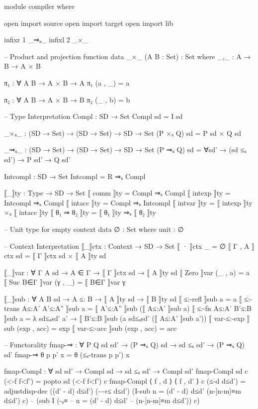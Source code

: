 \documentclass{article}
\begin{document}
\begin{prev}
\begin{code}
module compiler where

open import source
open import target
open import lib


infixr 1 _⇒ₛ_ 
infixl 2 _×_

-- Product and projection function
data _×_ (A B : Set) : Set where
    _,_ : A → B → A × B

π₁ : ∀ {A B} → A × B → A
π₁ (a , _) = a

π₂ : ∀ {A B} → A × B → B
π₂ (_ , b) = b

--  Type Interpretation
Compl : SD → Set
Compl sd = I sd

_×ₛ_ : (SD → Set) → (SD → Set) → SD → Set
(P ×ₛ Q) sd = P sd × Q sd

_⇒ₛ_ : (SD → Set) → (SD → Set) → SD → Set
(P ⇒ₛ Q) sd = ∀{sd'} → (sd ≤ₛ sd') → P sd' → Q sd' 

Intcompl : SD → Set
Intcompl = R ⇒ₛ Compl


⟦_⟧ty : Type → SD → Set
⟦ comm ⟧ty = Compl ⇒ₛ Compl
⟦ intexp ⟧ty = Intcompl ⇒ₛ Compl
⟦ intacc ⟧ty = Compl ⇒ₛ Intcompl
⟦ intvar ⟧ty = ⟦ intexp ⟧ty ×ₛ ⟦ intacc ⟧ty
⟦ θ₁ ⇒ θ₂ ⟧ty = ⟦ θ₁ ⟧ty ⇒ₛ ⟦ θ₂ ⟧ty

-- Unit type for empty context
data ∅ : Set where
    unit : ∅

-- Context Interpretation
⟦_⟧ctx : Context → SD → Set
⟦ · ⟧ctx _ = ∅
⟦ Γ , A ⟧ctx sd = ⟦ Γ ⟧ctx sd × ⟦ A ⟧ty sd

⟦_⟧var : ∀ {Γ A sd} → A ∈ Γ → ⟦ Γ ⟧ctx sd → ⟦ A ⟧ty sd
⟦ Zero ⟧var (_ , a) = a
⟦ Suc B∈Γ ⟧var (γ , _) =  ⟦ B∈Γ ⟧var γ

⟦_⟧sub : ∀ {A B sd} → A ≤: B → ⟦ A ⟧ty sd → ⟦ B ⟧ty sd
⟦ ≤:-refl ⟧sub a = a
⟦ ≤:-trans A≤:A' A'≤:A'' ⟧sub a = ⟦ A'≤:A'' ⟧sub (⟦ A≤:A' ⟧sub a)
⟦ ≤:-fn A≤:A' B'≤:B ⟧sub a = λ sd≤ₛsd' a' → ⟦ B'≤:B ⟧sub (a sd≤ₛsd' (⟦ A≤:A' ⟧sub a'))
⟦ var-≤:-exp ⟧sub (exp , acc) = exp
⟦ var-≤:-acc ⟧sub (exp , acc) = acc


-- Functorality
fmap-⇒ : ∀ {P Q sd sd'} → (P ⇒ₛ Q) sd → sd ≤ₛ sd' → (P ⇒ₛ Q) sd'
fmap-⇒ θ p p' x = θ (≤ₛ-trans p p') x

fmap-Compl : ∀ {sd sd'} → Compl sd → sd ≤ₛ sd' → Compl sd'
fmap-Compl {sd} c (<-f f<f') = popto sd (<-f f<f') c
fmap-Compl {⟨ f , d ⟩} {⟨ f , d' ⟩} c (≤-d d≤d') = 
    adjustdisp-dec ((d' - d) d≤d') (-→≤ d≤d') 
        (I-sub {n = (d' - d) d≤d'} (n-[n-m]≡m d≤d') c)
        -- (sub I (-ₛ≡ 
        --     {n = (d' - d) d≤d'} 
        --         (n-[n-m]≡m d≤d')) c)


\end{code}
\end{prev}
\end{document}
